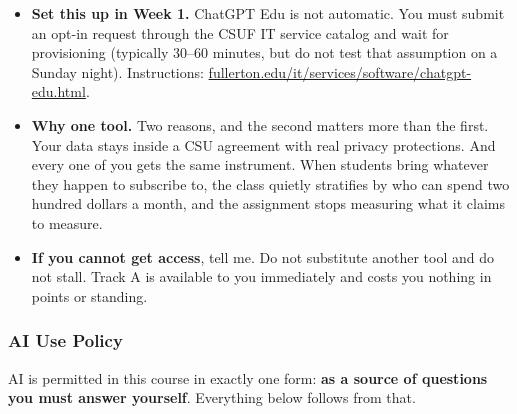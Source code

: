\documentclass[11pt]{article}     %
\begin{document}
\begin{itemize}
    \item \textbf{Set this up in Week 1.} ChatGPT Edu is not automatic. You must submit an opt-in request through the CSUF IT service catalog and wait for provisioning (typically 30--60 minutes, but do not test that assumption on a Sunday night). Instructions: \href{https://www.fullerton.edu/it/services/software/chatgpt-edu.html}{fullerton.edu/it/services/software/chatgpt-edu.html}.
    \item \textbf{Why one tool.} Two reasons, and the second matters more than the first. Your data stays inside a CSU agreement with real privacy protections. And every one of you gets the same instrument. When students bring whatever they happen to subscribe to, the class quietly stratifies by who can spend two hundred dollars a month, and the assignment stops measuring what it claims to measure.
    \item \textbf{If you cannot get access}, tell me. Do not substitute another tool and do not stall. Track A is available to you immediately and costs you nothing in points or standing.
\end{itemize}

\subsubsection*{AI Use Policy}

AI is permitted in this course in exactly one form: \textbf{as a source of questions you must answer yourself}. Everything below follows from that.
\end{document}
